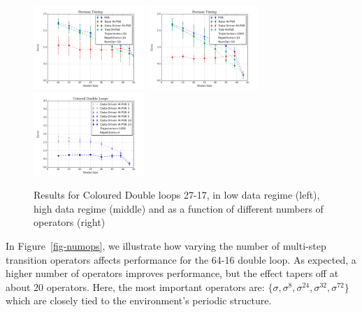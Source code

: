 \documentclass[letterpaper]{article}
\begin{document}
\begin{figure}[t!]
\centering
\includegraphics[width=42mm]{MO_50.png}
%
\includegraphics[width=42mm]{MO_1k.png}
%
\includegraphics[width=42mm]{numOpComparison.png}\vspace*{-4mm}
\caption{Results for Coloured Double loops 27-17, in low data regime (left), high data regime (middle) and as a function of different numbers of operators (right)\label{fig-colnumops}\vspace*{-4mm}}
\end{figure}

In Figure~\ref{fig-numops}, we illustrate how varying the number of multi-step transition operators affects performance for the 64-16 double loop. As expected, a higher number of operators improves performance, but the effect tapers off at about 20 operators. Here, the most important operators are: $\{\sigma,\sigma^{8},\sigma^{24},\sigma^{32},\sigma^{72}\}$ which are closely tied to the environment's periodic structure.

\end{document}
